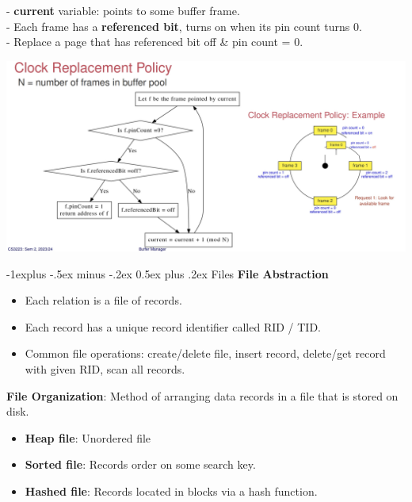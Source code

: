 \documentclass[10pt, landscape]{article}
\makeatletter
\renewcommand{\subsection}{\@startsection{subsection}{2}{0mm}%
                                {-1explus -.5ex minus -.2ex}%
                                {0.5ex plus .2ex}%
                                {\normalfont\normalsize\bfseries}}
\makeatother
\begin{document}
\begin{multicols*}{3}
\begin{itemize}
\begin{itemize}
		- \textbf{current} variable: points to some buffer frame. \\
		- Each frame has a \textbf{referenced bit}, turns on when its pin count turns 0. \\
		- Replace a page that has referenced bit off \& pin count = 0.
	\end{itemize}
\centerline{\includegraphics[width = 1\linewidth]{clockReplacementPolicy}}
\end{itemize}

\columnbreak

\subsection{Files}
\textbf{File Abstraction}
\begin{itemize}
	\item Each relation is a file of records.
	\item Each record has a unique record identifier called RID / TID.
	\item Common file operations: create/delete file, insert record, delete/get record with given RID, scan all records.
\end{itemize}
\textbf{File Organization}: Method of arranging data records in a file that is stored on disk.
\begin{itemize}
	\item \textbf{Heap file}: Unordered file
	\item \textbf{Sorted file}: Records order on some search key.
	\item \textbf{Hashed file}: Records located in blocks via a hash function.
\end{itemize}


\end{multicols*}
\end{document}
